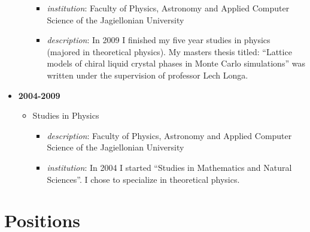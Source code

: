 \documentclass{article}
\providecommand{\tightlist}{%
  \setlength{\itemsep}{0pt}\setlength{\parskip}{0pt}}
\begin{document}
\begin{itemize}
\begin{itemize}
    \begin{itemize}
    \tightlist
    \item
      \emph{institution}: Faculty of Physics, Astronomy and Applied
      Computer Science of the Jagiellonian University
    \item
      \emph{description}: In 2009 I finished my five year studies in
      physics (majored in theoretical physics). My masters thesis
      titled: ``Lattice models of chiral liquid crystal phases in Monte
      Carlo simulations'' was written under the supervision of professor
      Lech Longa.
    \end{itemize}
  \end{itemize}
\item
  \textbf{2004-2009}

  \begin{itemize}
  \tightlist
  \item
    Studies in Physics

    \begin{itemize}
    \tightlist
    \item
      \emph{description}: Faculty of Physics, Astronomy and Applied
      Computer Science of the Jagiellonian University
    \item
      \emph{institution}: In 2004 I started ``Studies in Mathematics and
      Natural Sciences''. I chose to specialize in theoretical physics.
    \end{itemize}
  \end{itemize}
\end{itemize}

\hypertarget{positions}{%
\section{Positions}\label{positions}}
\end{document}
